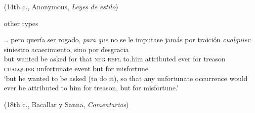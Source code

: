     (14th c., Anonymous, \textit{Leyes de estilo})
    
\ex \label{ex:key:278-5} other types

    \gll … pero quería ser rogado, \textit{para} \textit{que} no se le imputase jamás por traición \textit{cualquier} siniestro acaecimiento, sino por desgracia\\
{} but wanted be asked for that \textsc{neg} \textsc{refl} to.him attributed ever for treason \textsc{cualquier} unfortunate event but for misfortune\\  
    \glt ‘but he wanted to be asked (to do it), so that any unfortunate occurrence would ever be attributed to him for treason, but for misfortune.’

    (18th c., Bacallar y Sanna, \textit{Comentarios})
\z
\z







